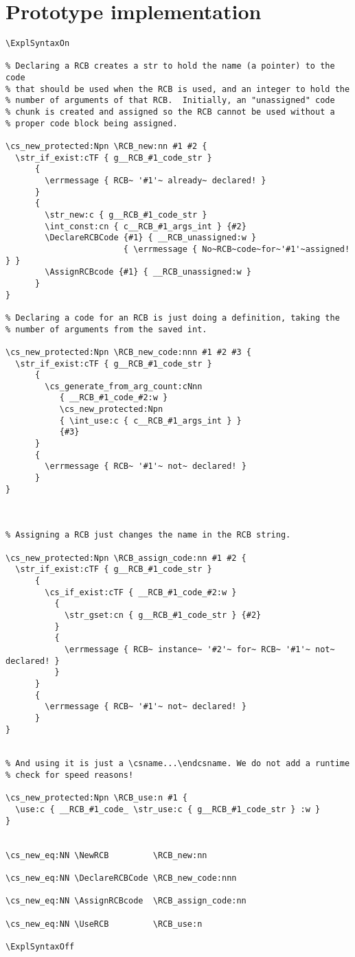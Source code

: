 \documentclass{article}
\newcommand\cs[1]{\texttt{\textbackslash #1}}
\begin{document}
\section{Prototype implementation}

\begin{verbatim}
\ExplSyntaxOn

% Declaring a RCB creates a str to hold the name (a pointer) to the code
% that should be used when the RCB is used, and an integer to hold the
% number of arguments of that RCB.  Initially, an "unassigned" code
% chunk is created and assigned so the RCB cannot be used without a
% proper code block being assigned.

\cs_new_protected:Npn \RCB_new:nn #1 #2 {
  \str_if_exist:cTF { g__RCB_#1_code_str }
      {
        \errmessage { RCB~ '#1'~ already~ declared! }
      }
      {
        \str_new:c { g__RCB_#1_code_str }
        \int_const:cn { c__RCB_#1_args_int } {#2}
        \DeclareRCBCode {#1} { __RCB_unassigned:w }
                        { \errmessage { No~RCB~code~for~'#1'~assigned! } }
        \AssignRCBcode {#1} { __RCB_unassigned:w }
      }
}

% Declaring a code for an RCB is just doing a definition, taking the
% number of arguments from the saved int.

\cs_new_protected:Npn \RCB_new_code:nnn #1 #2 #3 {
  \str_if_exist:cTF { g__RCB_#1_code_str }
      {
        \cs_generate_from_arg_count:cNnn
           { __RCB_#1_code_#2:w }
           \cs_new_protected:Npn
           { \int_use:c { c__RCB_#1_args_int } }
           {#3}
      }
      {
        \errmessage { RCB~ '#1'~ not~ declared! }
      }
}



% Assigning a RCB just changes the name in the RCB string.

\cs_new_protected:Npn \RCB_assign_code:nn #1 #2 {
  \str_if_exist:cTF { g__RCB_#1_code_str }
      {
        \cs_if_exist:cTF { __RCB_#1_code_#2:w }
          {
            \str_gset:cn { g__RCB_#1_code_str } {#2}
          }
          {
            \errmessage { RCB~ instance~ '#2'~ for~ RCB~ '#1'~ not~ declared! }
          }
      }
      {
        \errmessage { RCB~ '#1'~ not~ declared! }
      }
}
        

% And using it is just a \csname...\endcsname. We do not add a runtime
% check for speed reasons!

\cs_new_protected:Npn \RCB_use:n #1 {
  \use:c { __RCB_#1_code_ \str_use:c { g__RCB_#1_code_str } :w }
}


\cs_new_eq:NN \NewRCB         \RCB_new:nn 

\cs_new_eq:NN \DeclareRCBCode \RCB_new_code:nnn

\cs_new_eq:NN \AssignRCBcode  \RCB_assign_code:nn

\cs_new_eq:NN \UseRCB         \RCB_use:n

\ExplSyntaxOff
\end{verbatim}
\end{document}
